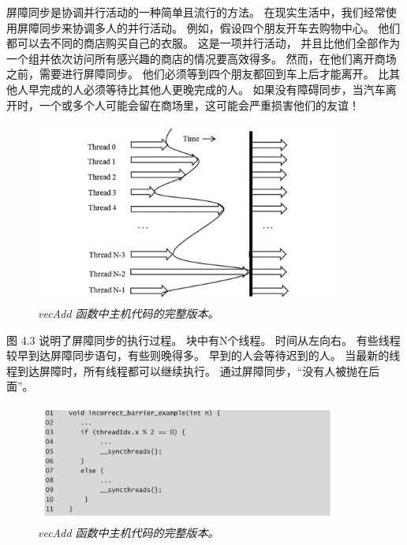 屏障同步是协调并行活动的一种简单且流行的方法。 在现实生活中，我们经常使用屏障同步来协调多人的并行活动。 
例如，假设四个朋友开车去购物中心。 他们都可以去不同的商店购买自己的衣服。 这是一项并行活动，
并且比他们全部作为一个组并依次访问所有感兴趣的商店的情况要高效得多。 然而，在他们离开商场之前，需要进行屏障同步。 
他们必须等到四个朋友都回到车上后才能离开。 比其他人早完成的人必须等待比其他人更晚完成的人。 
如果没有障碍同步，当汽车离开时，一个或多个人可能会留在商场里，这可能会严重损害他们的友谊！

\begin{figure}[H]
	\centering
	\includegraphics[width=0.9\textwidth]{figs/F4.3.png}
	\caption{\textit{\color{red} vecAdd 函数中主机代码的完整版本。}}
\end{figure}

图 4.3 说明了屏障同步的执行过程。 块中有N个线程。 时间从左向右。 有些线程较早到达屏障同步语句，有些则晚得多。 
早到的人会等待迟到的人。 当最新的线程到达屏障时，所有线程都可以继续执行。 通过屏障同步，“没有人被抛在后面”。

\begin{figure}[H]
	\centering
	\includegraphics[width=0.9\textwidth]{figs/F4.4.png}
	\caption{\textit{\color{red} vecAdd 函数中主机代码的完整版本。}}
\end{figure}

